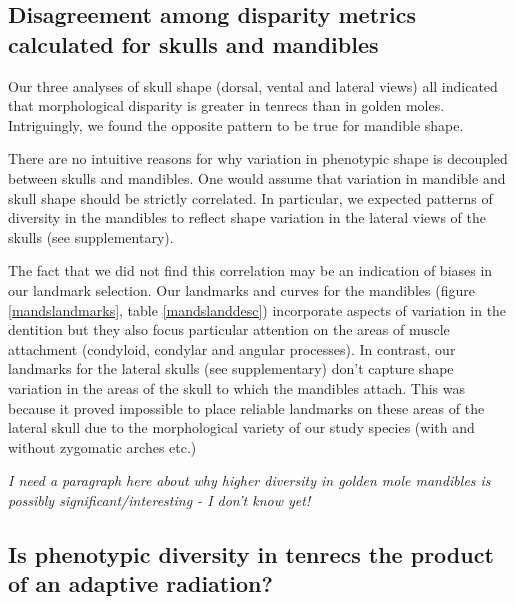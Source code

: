 \documentclass[12pt,a4paper]{article}
\begin{document}
\subsection{Disagreement among disparity metrics calculated for skulls and mandibles}

Our three analyses of skull shape (dorsal, vental and lateral views) all indicated that morphological disparity is greater in tenrecs than in golden moles. Intriguingly, we found the opposite pattern to be true for mandible shape.

There are no intuitive reasons for why variation in phenotypic shape is decoupled between skulls and mandibles. One would assume that variation in mandible and skull shape should be strictly correlated. In particular, we expected patterns of diversity in the mandibles to reflect shape variation in the lateral views of the skulls (see supplementary). 

The fact that we did not find this correlation may be an indication of biases in our landmark selection. Our landmarks and curves for the mandibles (figure \ref{mandslandmarks}, table \ref{mandslanddesc}) incorporate aspects of variation in the dentition but they also focus particular attention on the areas of muscle attachment (condyloid, condylar and angular processes). In contrast, our landmarks for the lateral skulls (see supplementary) don't capture shape variation in the areas of the skull to which the mandibles attach. This was because it proved impossible to place reliable landmarks on these areas of the lateral skull due to the morphological variety of our study species (with and without zygomatic arches etc.)



\textit{I need a paragraph here about why higher diversity in golden mole mandibles is possibly significant/interesting - I don't know yet!}


\subsection{Is phenotypic diversity in tenrecs the product of an adaptive radiation?}
\end{document}
